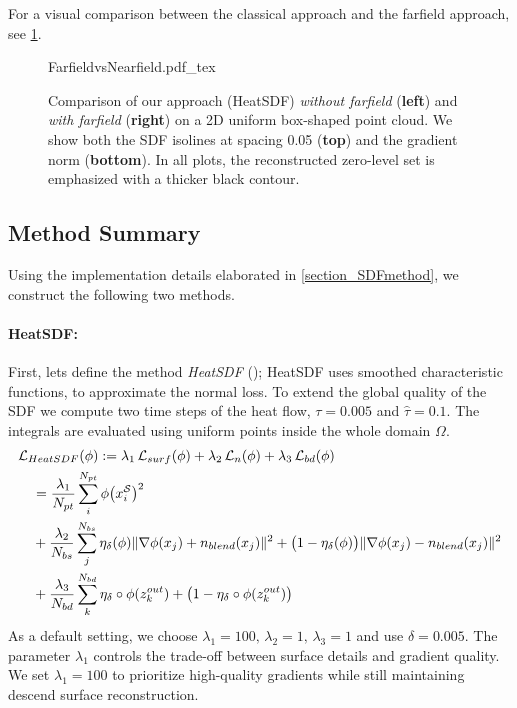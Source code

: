 \documentclass[12pt,openany]{book}
\def\S{\mathcal{S}}
\theoremstyle{plainnormal}
\theoremstyle{remark}
\begin{document}
For a visual comparison between the classical approach and the farfield approach, see \cref{farfield_comp}.
\begin{figure}
    \centering
    \begingroup
    \sffamily  %
    \def\svgwidth{\textwidth}
    {FarfieldvsNearfield.pdf_tex}
    \endgroup
    \caption{Comparison of our approach (HeatSDF) \emph{without farfield} (\textbf{left}) and \emph{with farfield} (\textbf{right}) on a 2D uniform box-shaped point cloud. We show both the SDF isolines at spacing 0.05 (\textbf{top}) and the gradient norm (\textbf{bottom}). In all plots, the reconstructed zero-level set is emphasized with a thicker black contour.}\label{farfield_comp}
\end{figure}
\subsection{Method Summary}\label{ch:methodsummary} Using the implementation details elaborated in \cref{section_SDFmethod}, we construct the following two methods.
\paragraph{HeatSDF:} First, lets define the method \emph{HeatSDF} (\cite{weidemaier2025sdfsunorientedpointclouds}); HeatSDF uses smoothed characteristic functions, to approximate the normal loss. To extend the global quality of the SDF we compute two time steps of the heat flow, $\tau = 0.005$ and $\hat \tau = 0.1 $. The integrals are evaluated using uniform points inside the whole domain $\Omega$.
\begin{align}
    &\mathcal{L}_{HeatSDF}(\phi) := \lambda_1\, \mathcal{L}_{surf}(\phi) + \lambda _2\,\mathcal{L}_{n}(\phi) + \lambda_3\,\mathcal{L}_{bd}(\phi)\notag \\
    &\quad =\frac{\lambda_1}{N_{pt}}\sum_i^{N_{pt}}\phi\big( x_i^\S\big)^2
     \notag\\\notag & \quad + \frac{\lambda_2}{N_{bs}}\sum_j^{N_{bs}}
\eta_\delta(\phi) \|\nabla \phi(x_j) + n_{blend}(x_j)\|^2 + \big(1 - \eta_\delta(\phi)\big) \|\nabla \phi(x_j) - n_{blend}(x_j)\|^2 \notag\\ & \quad+ \frac{\lambda_3}{N_{bd}} \sum_k^{N_{bd}} \eta_\delta\circ\phi(z_k^{out}) +\big(1-\eta_\delta\circ\phi(z_k^{out})\big) 
\end{align}
As a default setting, we choose $\lambda_1 = 100, \,\lambda_2 = 1, \,\lambda_3 = 1$ and use $\delta = 0.005$. The parameter $\lambda_1$ controls the trade-off between surface details and gradient quality. We set $\lambda_1 = 100$ to prioritize high-quality gradients while still maintaining descend surface reconstruction.
\end{document}
